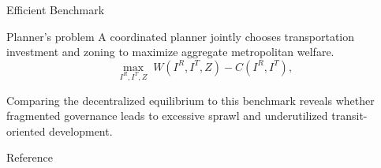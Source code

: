 \documentclass[10pt]{beamer}
\begin{document}
\begin{frame}{Efficient Benchmark}
\begin{block}{Planner's problem}
A coordinated planner jointly chooses transportation investment and zoning to maximize aggregate metropolitan welfare.
\[
\max_{I^R,I^T,Z}
\; W(I^R,I^T,Z)-C(I^R,I^T),
\]

\end{block}


\vspace{0.35cm}
Comparing the decentralized equilibrium to this benchmark reveals whether fragmented governance leads to excessive sprawl and underutilized transit-oriented development.
\end{frame}


\begin{frame}{Reference}

\printbibliography
    
\end{frame}
\end{document}
